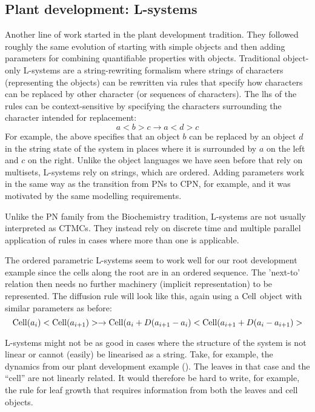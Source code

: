 \subsection{Plant development: L-systems}
\label{subsec:lSystems}
Another line of work started in the plant development tradition.
They followed roughly the same evolution of starting with simple objects and
then adding parameters for combining quantifiable properties with
objects. Traditional object-only L-systems are a string-rewriting formalism
where strings of characters (representing the objects) can be rewritten via
rules that specify how characters can be replaced by other character (or
sequences of characters). The lhs of the rules can be context-sensitive by
specifying the characters surrounding the character intended for replacement:
$$
a< b > c \rightarrow a < d > c
$$
For example, the above specifies that an object $b$ can be replaced by an object
$d$ in the string state of the system in places where it is surrounded by $a$ on
the left and $c$ on the right. Unlike the object languages we have seen before
that rely on multisets, L-systems rely on strings, which are ordered. Adding
parameters work in the same way as the transition from PNs to CPN, for example,
and it was motivated by the same modelling requirements.

Unlike the PN family from the Biochemistry tradition, L-systems are not usually
interpreted as CTMCs. They instead rely on discrete time and multiple parallel
application of rules in cases where more than one is applicable.

The ordered parametric L-systems seem to work well for our root development
example since the cells along the root are in an ordered sequence. The
'next-to' relation then needs no further machinery (implicit representation) to
be represented. The diffusion rule will look like this, again using a
$\mathrm{Cell}$ object with similar parameters as before:
$$
\mathrm{Cell}(a_i)< \mathrm{Cell}(a_{i+1}) > \rightarrow \mathrm{Cell}(a_i+D(a_{i+1}-a_i)< \mathrm{Cell}(a_{i+1}+D(a_i-a_{i+1}) >
$$

L-systems might not be as good in cases where the structure of the system is
not linear or cannot (easily) be linearised as a string. Take, for example, the
dynamics from our plant development example (). The
leaves in that case and the ``cell'' are not linearly related. It would therefore
be hard to write, for example, the rule for leaf growth that requires
information from both the leaves and cell objects.

